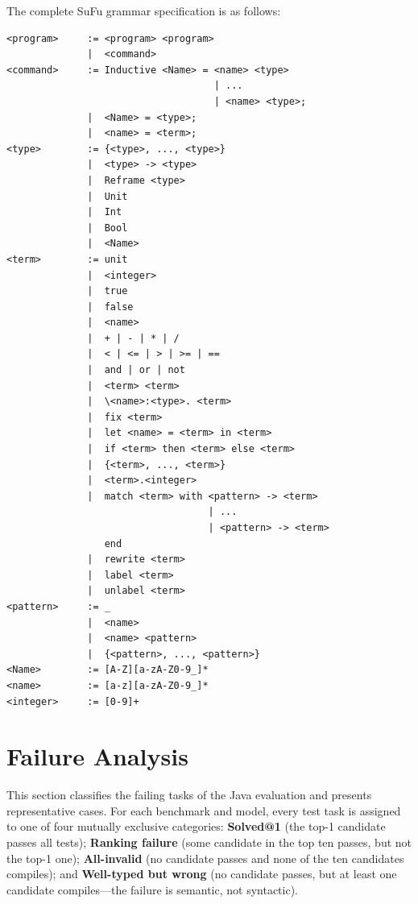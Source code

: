 \documentclass[manuscript,screen]{acmart}
\begin{document}
The complete SuFu grammar specification is as follows:
\begin{tcolorbox}[
    colback=blue!5!white,
    colframe=blue!50!black,
    title=SuFu Language Grammar,
    fonttitle=\bfseries,
    boxrule=1pt,
    arc=3pt,
    breakable
]
\begin{Verbatim}[fontsize=\small]
<program>     := <program> <program>
              |  <command>
<command>     := Inductive <Name> = <name> <type> 
                                    | ... 
                                    | <name> <type>;
              |  <Name> = <type>;
              |  <name> = <term>;
<type>        := {<type>, ..., <type>}
              |  <type> -> <type>
              |  Reframe <type>
              |  Unit 
              |  Int 
              |  Bool 
              |  <Name>
<term>        := unit 
              |  <integer> 
              |  true 
              |  false 
              |  <name>
              |  + | - | * | / 
              |  < | <= | > | >= | == 
              |  and | or | not
              |  <term> <term>
              |  \<name>:<type>. <term>
              |  fix <term>
              |  let <name> = <term> in <term>
              |  if <term> then <term> else <term>
              |  {<term>, ..., <term>}
              |  <term>.<integer>
              |  match <term> with <pattern> -> <term> 
                                   | ... 
                                   | <pattern> -> <term> 
                 end
              |  rewrite <term> 
              |  label <term> 
              |  unlabel <term>
<pattern>     := _ 
              |  <name>
              |  <name> <pattern>
              |  {<pattern>, ..., <pattern>}
<Name>        := [A-Z][a-zA-Z0-9_]*
<name>        := [a-z][a-zA-Z0-9_]*
<integer>     := [0-9]+
\end{Verbatim}
\end{tcolorbox}
 

\section{{\color{revblue}Failure Analysis}}\label{appendix-failure}

{\color{revblue}This section classifies the failing tasks of the Java evaluation and presents representative cases.
For each benchmark and model, every test task is assigned to one of four mutually exclusive categories:
}\textbf{\color{revblue}Solved@1} {\color{revblue}(the top-1 candidate passes all tests);
}\textbf{\color{revblue}Ranking failure} {\color{revblue}(some candidate in the top ten passes, but not the top-1 one);
}\textbf{\color{revblue}All-invalid} {\color{revblue}(no candidate passes and none of the ten candidates compiles); and
}\textbf{\color{revblue}Well-typed but wrong} {\color{revblue}(no candidate passes, but at least one candidate compiles---the failure is semantic, not syntactic).
}
\end{document}

